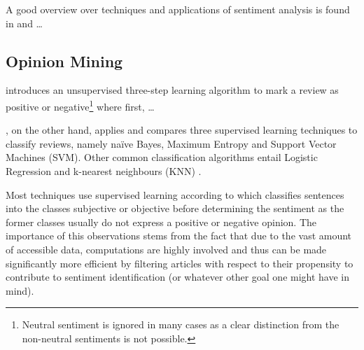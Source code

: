 A good overview over techniques and applications of sentiment analysis is found in \textcite{Feldman.2013} and \textcite{Liu.2012} \dots



\subsection{Opinion Mining}

\textcite{Turney.2002} introduces an unsupervised three-step learning algorithm to mark a review as positive or negative\footnote{Neutral sentiment is ignored in many cases as a clear distinction from the non-neutral sentiments is not possible.} where first, \dots


\textcite{Pang.2002}, on the other hand, applies and compares three supervised learning techniques to classify reviews, namely na\"{i}ve Bayes, Maximum Entropy and Support Vector Machines (SVM). Other common classification algorithms entail Logistic Regression and k-nearest neighbours (KNN) \parencite{Feldman.2013}.


Most techniques use supervised learning according to \textcite{Wiebe.1999} which classifies sentences into the classes subjective or objective before determining the sentiment as the former classes usually do not express a positive or negative opinion. The importance of this observations stems from the fact that due to the vast amount of accessible data, computations are highly involved and thus can be made significantly more efficient by filtering articles with respect to their propensity to contribute to sentiment identification (or whatever other goal one might have in mind). 

